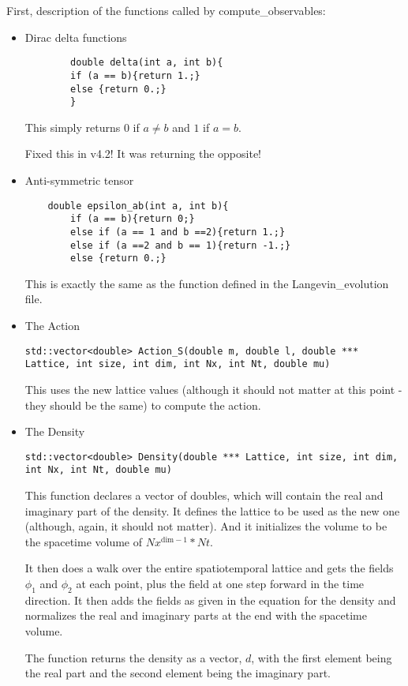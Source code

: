 \documentclass[../../RotatingBosons.tex]{subfiles}
\begin{document}
First, description of the functions called by compute\_observables:
\begin{itemize}
	\item Dirac delta functions
	\begin{lstlisting}
		double delta(int a, int b){
		if (a == b){return 1.;}
		else {return 0.;}
		}
	\end{lstlisting}
	This simply returns $0$ if $a \neq b$ and $1$ if $a = b$.
	
	Fixed this in v4.2! It was returning the opposite!
	
	\item Anti-symmetric tensor
	
	\begin{lstlisting}
	double epsilon_ab(int a, int b){
		if (a == b){return 0;}
		else if (a == 1 and b ==2){return 1.;}
		else if (a ==2 and b == 1){return -1.;}
		else {return 0.;}
	\end{lstlisting}
	
	This is exactly the same as the function defined in the Langevin\_evolution file.
	
	\item The Action
	
	\lstinline{std::vector<double> Action_S(double m, double l, double *** Lattice, int size, int dim, int Nx, int Nt, double mu)}
	
	This uses the new lattice values (although it should not matter at this point - they should be the same) to compute the action.
	
	\item The Density
	
	\lstinline{std::vector<double> Density(double *** Lattice, int size, int dim, int Nx, int Nt, double mu)}
	
	This function declares a vector of doubles, which will contain the real and imaginary part of the density. It defines the lattice to be used as the new one (although, again, it should not matter). And it initializes the volume to be the spacetime volume of $Nx^{\text{dim}-1}*Nt$. 
	
	It then does a walk over the entire spatiotemporal lattice and gets the fields $\phi_{1}$ and $\phi_{2}$ at each point, plus the field at one step forward in the time direction. It then adds the fields as given in the equation for the density and normalizes the real and imaginary parts at the end with the spacetime volume. 
	
	The function returns the density as a vector, $d$, with the first element being the real part and the second element being the imaginary part.
	

\end{itemize}
\end{document}
